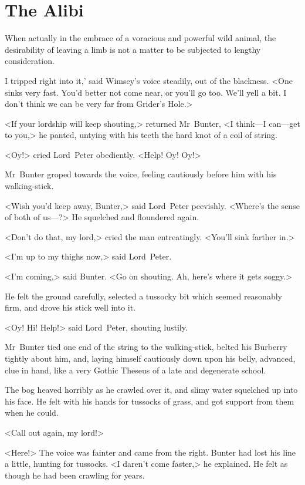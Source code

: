 
\chapter{The Alibi}

\epigraph{When actually in the embrace of a voracious and powerful wild animal, the desirability of leaving a limb is not a matter to be subjected to
lengthy consideration.}{}


\lettrine[ante=`]{I}{} tripped right into it,' said Wimsey's voice steadily, out of the blackness. <One sinks very fast. You'd better not come near, or you'll go too. We'll yell a bit. I don't think we can be very far from Grider's Hole.>

\zz
<If your lordship will keep shouting,> returned Mr~Bunter, <I think—I can—get to you,> he panted, untying with his teeth the hard knot of a coil of string.

<Oy!> cried Lord~Peter obediently. <Help! Oy! Oy!>

Mr~Bunter groped towards the voice, feeling cautiously before him with his walking-stick.

<Wish you'd keep away, Bunter,> said Lord~Peter peevishly. <Where's the sense of both of us—?> He squelched and floundered again.

<Don't do that, my lord,> cried the man entreatingly. <You'll sink farther in.>

<I'm up to my thighs now,> said Lord~Peter.

<I'm coming,> said Bunter. <Go on shouting. Ah, here's where it gets soggy.>

He felt the ground carefully, selected a tussocky bit which seemed reasonably firm, and drove his stick well into it.

<Oy! Hi! Help!> said Lord~Peter, shouting lustily.

Mr~Bunter tied one end of the string to the walking-stick, belted his Burberry tightly about him, and, laying himself cautiously down upon his belly, advanced, clue in hand, like a very Gothic Theseus of a late and degenerate school.

The bog heaved horribly as he crawled over it, and slimy water squelched up into his face. He felt with his hands for tussocks of grass, and got support from them when he could.

<Call out again, my lord!>

<Here!> The voice was fainter and came from the right. Bunter had lost his line a little, hunting for tussocks. <I daren't come faster,> he explained. He felt as though he had been crawling for years.

